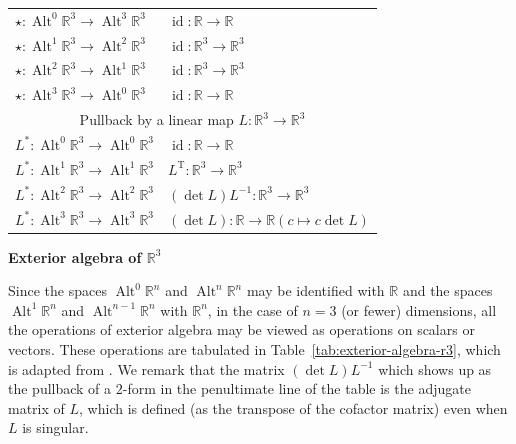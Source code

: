 \begin{table}[htbp]
\begin{tabular}{l|l}
$\star:\operatorname{Alt}^0\mathbb R^3\to\operatorname{Alt}^3\mathbb R^3$&$\operatorname{id}:\mathbb R\to\mathbb R$\\
$\star:\operatorname{Alt}^1\mathbb R^3\to\operatorname{Alt}^2\mathbb R^3$&$\operatorname{id}:\mathbb R^3\to\mathbb R^3$\\
$\star:\operatorname{Alt}^2\mathbb R^3\to\operatorname{Alt}^1\mathbb R^3$&$\operatorname{id}:\mathbb R^3\to\mathbb R^3$\\
$\star:\operatorname{Alt}^3\mathbb R^3\to\operatorname{Alt}^0\mathbb R^3$&$\operatorname{id}:\mathbb R\to\mathbb R$\\\hline
\multicolumn{2}{c}{{Pullback by a linear map $L:\mathbb R^3\to\mathbb R^3$}}\\\hline
$L^*:\operatorname{Alt}^0\mathbb R^3\to\operatorname{Alt}^0\mathbb R^3$&$\operatorname{id}:\mathbb R\to\mathbb R$\\
$L^*:\operatorname{Alt}^1\mathbb R^3\to\operatorname{Alt}^1\mathbb R^3$&$L^{\mathrm T}:\mathbb R^3\to\mathbb R^3$\\
$L^*:\operatorname{Alt}^2\mathbb R^3\to\operatorname{Alt}^2\mathbb R^3$&$(\det L)L^{-1}:\mathbb R^3\to\mathbb R^3$\\
$L^*:\operatorname{Alt}^3\mathbb R^3\to\operatorname{Alt}^3\mathbb R^3$&$(\det L):\mathbb R\to\mathbb R$\quad$(c\mapsto c\det L)$\\\hline
\end{tabular}
\end{table}

\medskip\noindent\textbf{{Exterior algebra of $\mathbb R^3$}}\par
{Since the spaces $\operatorname{Alt}^0\mathbb R^n$ and $\operatorname{Alt}^n\mathbb R^n$ may be identified with $\mathbb R$ and the spaces $\operatorname{Alt}^1\mathbb R^n$ and $\operatorname{Alt}^{n-1}\mathbb R^n$ with $\mathbb R^n$, in the case of $n=3$ (or fewer) dimensions, all the operations of exterior algebra may be viewed as operations on scalars or vectors. These operations are tabulated in Table~\ref{tab:exterior-algebra-r3}, which is adapted from . We remark that the matrix $(\det L)L^{-1}$ which shows up as the pullback of a $2$-form in the penultimate line of the table is the adjugate matrix of $L$, which is defined (as the transpose of the cofactor matrix) even when $L$ is singular.}
